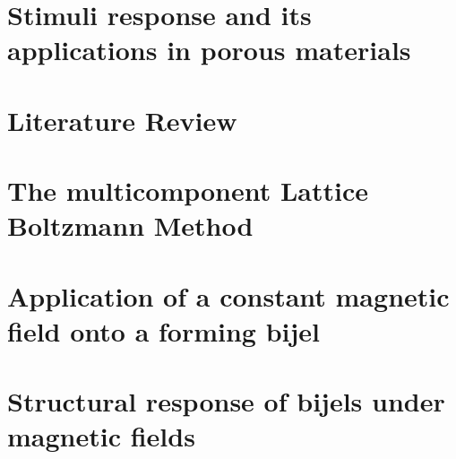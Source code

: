 \documentclass{udthesis}
\begin{document}
\newpage








\chapter{Stimuli response and its applications in porous materials}


\chapter{Literature Review}


\chapter{The multicomponent Lattice Boltzmann Method}








\chapter{Application of a constant magnetic field onto a forming bijel}



\chapter{Structural response of bijels under magnetic fields}


\end{document}
